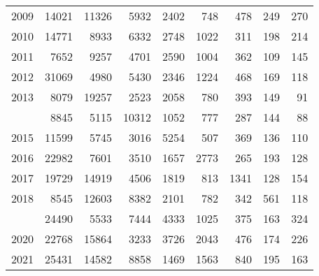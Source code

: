 \documentclass[
]{article}
\begin{document}
\begin{longtable}[t]{lrrrrrrrr}
2009 & 14021 & 11326 & 5932 & 2402 & 748 & 478 & 249 & 270\\
2010 & 14771 & 8933 & 6332 & 2748 & 1022 & 311 & 198 & 214\\
2011 & 7652 & 9257 & 4701 & 2590 & 1004 & 362 & 109 & 145\\
2012 & 31069 & 4980 & 5430 & 2346 & 1224 & 468 & 169 & 118\\
2013 & 8079 & 19257 & 2523 & 2058 & 780 & 393 & 149 & 91\\
\addlinespace
2014 & 8845 & 5115 & 10312 & 1052 & 777 & 287 & 144 & 88\\
2015 & 11599 & 5745 & 3016 & 5254 & 507 & 369 & 136 & 110\\
2016 & 22982 & 7601 & 3510 & 1657 & 2773 & 265 & 193 & 128\\
2017 & 19729 & 14919 & 4506 & 1819 & 813 & 1341 & 128 & 154\\
2018 & 8545 & 12603 & 8382 & 2101 & 782 & 342 & 561 & 118\\
\addlinespace
2019 & 24490 & 5533 & 7444 & 4333 & 1025 & 375 & 163 & 324\\
2020 & 22768 & 15864 & 3233 & 3726 & 2043 & 476 & 174 & 226\\
2021 & 25431 & 14582 & 8858 & 1469 & 1563 & 840 & 195 & 163\\*
\end{longtable}
\end{document}
